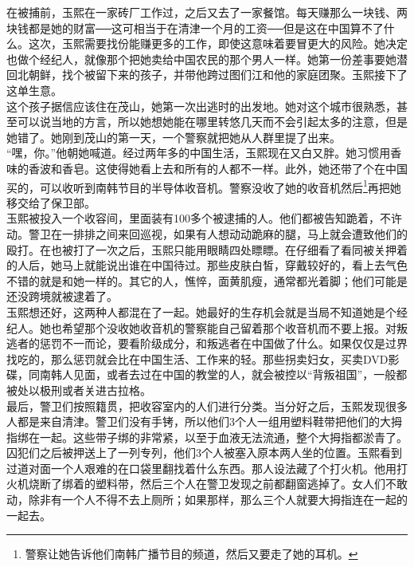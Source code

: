 在被捕前，玉熙在一家砖厂工作过，之后又去了一家餐馆。每天赚那么一块钱、两块钱都是她的财富──这可相当于在清津一个月的工资──但是这在中国算不了什么。这次，玉熙需要找份能赚更多的工作，即使这意味着要冒更大的风险。她决定也做个经纪人，就像那个把她卖给中国农民的那个男人一样。她第一份差事要她潜回北朝鲜，找个被留下来的孩子，并带他跨过图们江和他的家庭团聚。玉熙接下了这单生意。\\

这个孩子据信应该住在茂山，她第一次出逃时的出发地。她对这个城市很熟悉，甚至可以说当地的方言，所以她想她能在哪里转悠几天而不会引起太多的注意，但是她错了。她刚到茂山的第一天，一个警察就把她从人群里提了出来。\\

“嘿，你。”他朝她喊道。经过两年多的中国生活，玉熙现在又白又胖。她习惯用香味的香波和香皂。这使得她看上去和所有的人都不一样。此外，她还带了个在中国买的，可以收听到南韩节目的半导体收音机。警察没收了她的收音机然后\footnote{警察让她告诉他们南韩广播节目的频道，然后又要走了她的耳机。}再把她移交给了保卫部。\\

玉熙被投入一个收容间，里面装有100多个被逮捕的人。他们都被告知跪着，不许动。警卫在一排排之间来回巡视，如果有人想动动跪麻的腿，马上就会遭致他们的殴打。在也被打了一次之后，玉熙只能用眼睛四处瞟瞟。在仔细看了看同被关押着的人后，她马上就能说出谁在中国待过。那些皮肤白皙，穿戴较好的，看上去气色不错的就是和她一样的。其它的人，憔悴，面黄肌瘦，通常都光着脚；他们可能是还没跨境就被逮着了。\\

玉熙想还好，这两种人都混在了一起。她最好的生存机会就是当局不知道她是个经纪人。她也希望那个没收她收音机的警察能自己留着那个收音机而不要上报。对叛逃者的惩罚不一而论，要看阶级成分，和叛逃者在中国做了什么。如果仅仅是过界找吃的，那么惩罚就会比在中国生活、工作来的轻。那些拐卖妇女，买卖DVD影碟，同南韩人见面，或者去过在中国的教堂的人，就会被控以“背叛祖国”，一般都被处以极刑或者关进古拉格。\\

最后，警卫们按照籍贯，把收容室内的人们进行分类。当分好之后，玉熙发现很多人都是来自清津。警卫们没有手铐，所以他们3个人一组用塑料鞋带把他们的大拇指绑在一起。这些带子绑的非常紧，以至于血液无法流通，整个大拇指都淤青了。囚犯们之后被押送上了一列专列，他们3个人被塞入原本两人坐的位置。玉熙看到过道对面一个人艰难的在口袋里翻找着什么东西。那人设法藏了个打火机。他用打火机烧断了绑着的塑料带，然后三个人在警卫发现之前都翻窗逃掉了。女人们不敢动，除非有一个人不得不去上厕所；如果那样，那么三个人就要大拇指连在一起的一起去。\\

